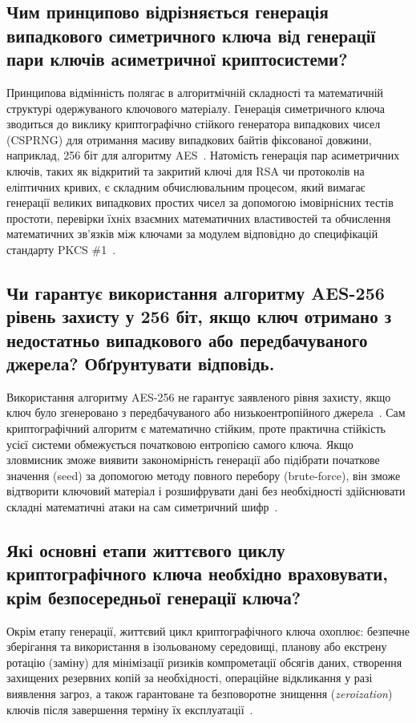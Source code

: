 \subsection{Чим принципово відрізняється генерація випадкового симетричного ключа від генерації пари ключів асиметричної криптосистеми?}

Принципова відмінність полягає в алгоритмічній складності та математичній структурі одержуваного 
ключового матеріалу. Генерація симетричного ключа зводиться до виклику криптографічно стійкого 
генератора випадкових чисел (CSPRNG) для отримання масиву випадкових байтів фіксованої довжини, 
наприклад, 256 біт для алгоритму AES~\cite{cryptography}. Натомість генерація пар
асиметричних ключів, таких як відкритий та закритий ключі для RSA чи протоколів на еліптичних кривих,
є складним обчислювальним процесом, який вимагає генерації великих випадкових простих чисел за
допомогою імовірнісних тестів простоти, перевірки їхніх взаємних математичних властивостей та
обчислення математичних зв'язків між ключами за модулем відповідно до специфікацій стандарту
PKCS \#1~\cite{RFC8017}.

\subsection{Чи гарантує використання алгоритму AES-256 рівень захисту у 256 біт, якщо ключ отримано з недостатньо випадкового або передбачуваного джерела? Обґрунтувати відповідь.}

Використання алгоритму AES-256 не гарантує заявленого рівня захисту, якщо ключ було згенеровано з 
передбачуваного або низькоентропійного джерела~\cite{SP800-57}. Сам криптографічний алгоритм є
математично стійким, проте практична стійкість усієї системи обмежується початковою ентропією самого
ключа. Якщо зловмисник зможе виявити закономірність генерації або підібрати початкове значення (seed)
за допомогою методу повного перебору (brute-force), він зможе відтворити ключовий матеріал і
розшифрувати дані без необхідності здійснювати складні математичні атаки на сам симетричний
шифр~\cite{SP800-57}.

\subsection{Які основні етапи життєвого циклу криптографічного ключа необхідно враховувати, крім безпосередньої генерації ключа?}

Окрім етапу генерації, життєвий цикл криптографічного ключа охоплює: безпечне зберігання та
використання в ізольованому середовищі, планову або екстрену ротацію (заміну) для мінімізації ризиків
компрометації обсягів даних, створення захищених резервних копій за необхідності, операційне відкликання
у разі виявлення загроз, а також гарантоване та безповоротне знищення (\textit{zeroization}) ключів після
завершення терміну їх експлуатації~\cite{SP800-57, FIPS140-3}.
